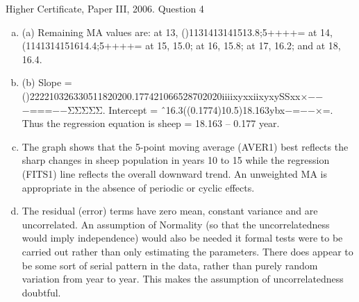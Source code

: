 \documentclass[a4paper,12pt]{article}
\begin{document}
Higher Certificate, Paper III, 2006. Question 4
\begin{enumerate}[(a)]
    \item 
(a) Remaining MA values are: at 13, ()1131413141513.8;5++++= at 14, (1141314151614.4;5++++= at 15, 15.0; at 16, 15.8; at 17, 16.2; and at 18, 16.4.
   \item(b) Slope = ()222210326330511820200.177421066528702020iiiixyxxiixyxySSxx×−−−===−−ΣΣΣΣΣ.
Intercept = ˆ16.3((0.1774)10.5)18.163ybx−=−−×=.
Thus the regression equation is sheep = 18.163 – 0.177 year.
   \item The graph shows that the 5-point moving average (AVER1) best reflects the sharp changes in sheep population in years 10 to 15 while the regression (FITS1) line reflects the overall downward trend.
An unweighted MA is appropriate in the absence of periodic or cyclic effects.
   \item The residual (error) terms have zero mean, constant variance and are uncorrelated. An assumption of Normality (so that the uncorrelatedness would imply independence) would also be needed it formal tests were to be carried out rather than only estimating the parameters. There does appear to be some sort of serial pattern in the data, rather than purely random variation from year to year. This makes the assumption of uncorrelatedness doubtful.
 \end{enumerate}
 
\end{document}
